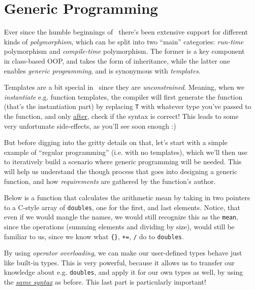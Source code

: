 \section{Generic Programming} \label{sec:generic_programming}

Ever since the humble beginnings of \Cpp\ there's been extensive support for different kinds of \emph{polymorphism}, which can be split into two ``main'' categories: \emph{run-time} polymorphism and \emph{compile-time} polymorphism. The former is a key component in class-based OOP, and takes the form of inheritance, while the latter one enables \emph{generic programming}, and is synonymous with \emph{templates}.

Templates are a bit special in \Cpp\ since they are \emph{unconstrained}. Meaning, when we \emph{instantiate} e.g. function templates, the compiler will first generate the function (that's the instantiation part) by replacing \texttt{T} with whatever type you've passed to the function, and only \underline{after}, check if the syntax is correct! This leads to some very unfortunate side-effects, as you'll see soon enough :)

But before digging into the gritty details on that, let's start with a simple example of ``regular programming'' (i.e. with no templates), which we'll then use to iteratively build a scenario where generic programming will be needed. This will help us understand the though process that goes into designing a generic function, and how \emph{requirements} are gathered by the function's author.

Below is a function that calculates the arithmetic mean by taking in two pointers to a C-style array of \texttt{doubles}, one for the first, and last elements. Notice, that even if we would mangle the names, we would still recognize this as the \texttt{mean}, since the operations (summing elements and dividing by size), would still be familiar to us, since we know what \texttt{\{\}}, \texttt{+=}, \texttt{/} do to \texttt{doubles}.



\noindent By using \emph{operator overloading}, we can make our user-defined types behave just like built-in types. This is very powerful, because it allows us to transfer our knowledge about e.g. \texttt{doubles}, and apply it for our own types as well, by using the \underline{\emph{same syntax}} as before. This last part is particularly important!



